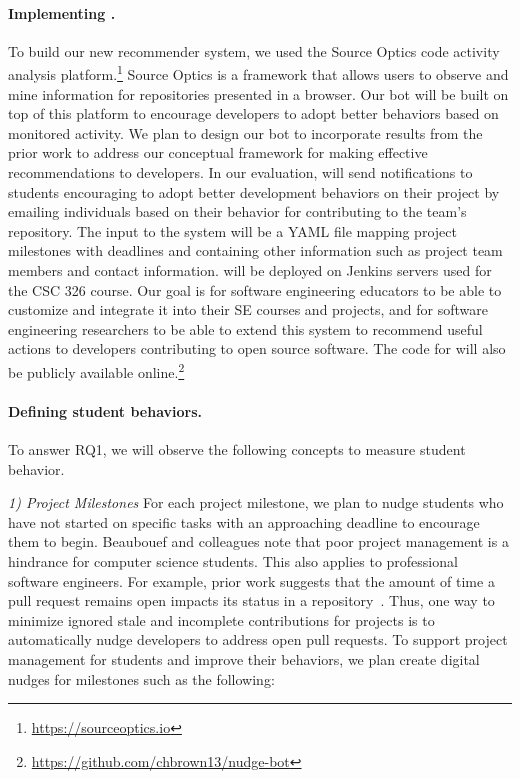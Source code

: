 \paragraph{Implementing \TOOL.} To build our new \TOOL recommender system, we used the Source Optics code activity analysis platform.\footnote{\url{https://sourceoptics.io}} Source Optics is a framework that allows users to observe and mine information for repositories presented in a browser. Our bot will be built on top of this platform to encourage developers to adopt better behaviors based on monitored activity. We plan to design our bot to incorporate results from the prior work to address our conceptual framework for making effective recommendations to developers. In our evaluation, \TOOL will send notifications to students encouraging to adopt better development behaviors on their project by emailing individuals based on their behavior for contributing to the team's repository. The input to the system will be a YAML file mapping project milestones with deadlines and containing other information such as project team members and contact information. \TOOL will be deployed on Jenkins servers used for the CSC 326 course. Our goal is for software engineering educators to be able to customize \TOOL and integrate it into their SE courses and projects, and for software engineering researchers to be able to extend this system to recommend useful actions to developers contributing to open source software. The code for \TOOL will also be publicly available online.\footnote{\url{https://github.com/chbrown13/nudge-bot}}

\paragraph{Defining student behaviors.} To answer RQ1, we will observe the following concepts to measure student behavior.

\textit{1) Project Milestones} For each project milestone, we plan to nudge students who have not started on specific tasks with an approaching deadline to encourage them to begin. Beaubouef and colleagues note that poor project management is a hindrance for computer science students. This also applies to professional software engineers. For example, prior work suggests that the amount of time a pull request remains open impacts its status in a repository~\cite{yu2015wait}. Thus, one way to minimize ignored stale and incomplete contributions for projects is to automatically nudge developers to address open pull requests. To support project management for students and improve their behaviors, we plan create digital nudges for milestones such as the following:

